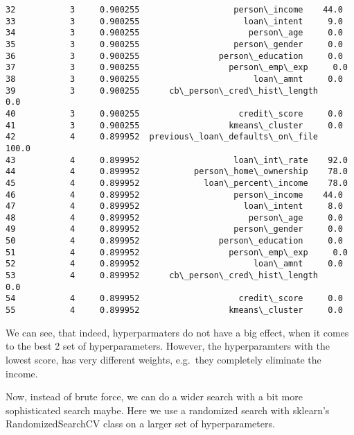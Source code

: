 \documentclass[11pt]{article}
\begin{document}
\begin{tcolorbox}[breakable, size=fbox, boxrule=.5pt, pad at break*=1mm, opacityfill=0]
\begin{Verbatim}[commandchars=\\\{\}]
32           3     0.900255                   person\_income    44.0
33           3     0.900255                     loan\_intent     9.0
34           3     0.900255                      person\_age     0.0
35           3     0.900255                   person\_gender     0.0
36           3     0.900255                person\_education     0.0
37           3     0.900255                  person\_emp\_exp     0.0
38           3     0.900255                       loan\_amnt     0.0
39           3     0.900255      cb\_person\_cred\_hist\_length     0.0
40           3     0.900255                    credit\_score     0.0
41           3     0.900255                  kmeans\_cluster     0.0
42           4     0.899952  previous\_loan\_defaults\_on\_file   100.0
43           4     0.899952                   loan\_int\_rate    92.0
44           4     0.899952           person\_home\_ownership    78.0
45           4     0.899952             loan\_percent\_income    78.0
46           4     0.899952                   person\_income    44.0
47           4     0.899952                     loan\_intent     8.0
48           4     0.899952                      person\_age     0.0
49           4     0.899952                   person\_gender     0.0
50           4     0.899952                person\_education     0.0
51           4     0.899952                  person\_emp\_exp     0.0
52           4     0.899952                       loan\_amnt     0.0
53           4     0.899952      cb\_person\_cred\_hist\_length     0.0
54           4     0.899952                    credit\_score     0.0
55           4     0.899952                  kmeans\_cluster     0.0
\end{Verbatim}
\end{tcolorbox}
        
    We can see, that indeed, hyperparmaters do not have a big effect, when
it comes to the best 2 set of hyperparameters. However, the
hyperparamters with the lowest score, has very different weights,
e.g.~they completely eliminate the income.

Now, instead of brute force, we can do a wider search with a bit more
sophisticated search maybe. Here we use a randomized search with
sklearn's RandomizedSearchCV class on a larger set of hyperparameters.
\end{document}
